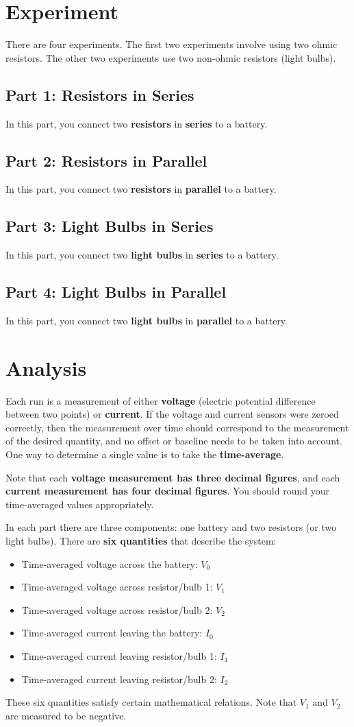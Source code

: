 \section{Experiment}
%
There are four experiments. The first two experiments involve using two ohmic resistors. The other two experiments use two non-ohmic resistors (light bulbs).
%
\subsection{Part 1: Resistors in Series}
%
In this part, you connect two \textbf{resistors} in \textbf{series} to a battery.
%
\subsection{Part 2: Resistors in Parallel}
%
In this part, you connect two \textbf{resistors} in \textbf{parallel} to a battery.
%
\subsection{Part 3: Light Bulbs in Series}
%
In this part, you connect two \textbf{light bulbs} in \textbf{series} to a battery.
%
\subsection{Part 4: Light Bulbs in Parallel}
%
In this part, you connect two \textbf{light bulbs} in \textbf{parallel} to a battery.
%
\section{Analysis}
%
Each run is a measurement of either \textbf{voltage} (electric potential difference between two points) or \textbf{current}. If the voltage and current sensors were zeroed correctly, then the measurement over time should correspond to the measurement of the desired quantity, and no offset or baseline needs to be taken into account. One way to determine a single value is to take the \textbf{time-average}.

Note that each \textbf{voltage measurement has three decimal figures}, and each \textbf{current measurement has four decimal figures}. You should round your time-averaged values appropriately.

In each part there are three components: one battery and two resistors (or two light bulbs). There are \textbf{six quantities} that describe the system:
\begin{itemize}
	\item Time-averaged voltage across the battery: $V_{0}$
	\item Time-averaged voltage across resistor/bulb 1: $V_{1}$
	\item Time-averaged voltage across resistor/bulb 2: $V_{2}$
	\item Time-averaged current leaving the battery: $I_{0}$
	\item Time-averaged current leaving resistor/bulb 1: $I_{1}$
	\item Time-averaged current leaving resistor/bulb 2: $I_{2}$
\end{itemize}
These six quantities satisfy certain mathematical relations. Note that $V_{1}$ and $V_{2}$ are measured to be negative.
%
